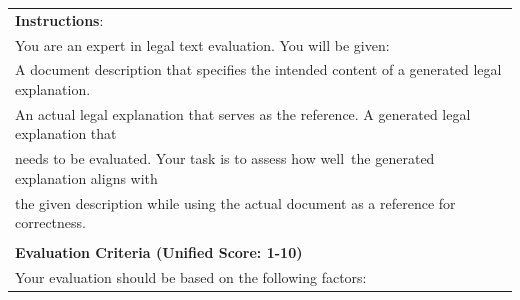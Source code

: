 \begin{table}[ht]
\centering
\begin{tabular}{|l|}
\hline
\textbf{Instructions}:\\
You are an expert in legal text evaluation. You will be given:\\

A document description that specifies the intended content of a generated legal explanation.\\
An actual legal explanation that serves as the reference. A generated legal explanation that\\ needs to be evaluated.
Your task is to assess how well\ the generated explanation aligns with\\ the given description while using the actual document as a reference for correctness.\\
\\

\textbf{Evaluation Criteria (Unified Score: 1-10)}\\
Your evaluation should be based on the following factors:\\


\end{tabular}
\end{table}
